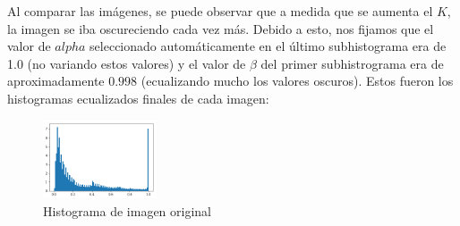\documentclass[10pt, a4paper]{article}
\begin{document}
\begin{figure}[H]
\begin{subfigure}{0.3\textwidth}
    \end{subfigure}\hfill
\end{figure}

Al comparar las imágenes, se puede observar que a medida que se aumenta el $K$, la imagen se iba oscureciendo cada vez más. Debido a esto, nos fijamos que el valor de $alpha$ seleccionado automáticamente en el último subhistograma era de 1.0 (no variando estos valores) y el valor de $\beta$ del primer subhistrograma era de aproximadamente $0.998$ (ecualizando mucho los valores oscuros). Estos fueron los histogramas ecualizados finales de cada imagen:

\begin{figure}[H]
	\centering
        \includegraphics[width=0.3\textwidth]{patitos1-histogramaOriginal.png}
        \caption{Histograma de imagen original}
\end{figure}
\end{document}
